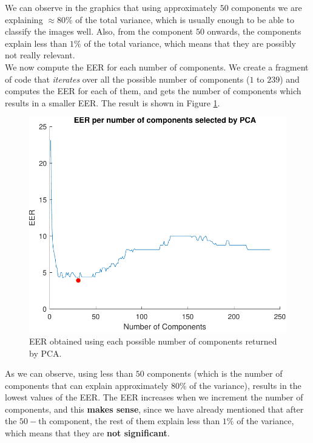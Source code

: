 \documentclass[a4paper]{article}
\begin{document}
We can observe in the graphics that using approximately \(50\) components we are explaining \(\approx 80\%\) of the total variance, which is usually enough to be able to classify the images well. Also, from the component \(50\) onwards, the components explain less than \(1\%\) of the total variance, which means that they are possibly not really relevant.\\

We now compute the EER for each number of components. We create a fragment of code that \emph{iterates} over all the possible number of components (\(1\) to \(239\)) and computes the EER for each of them, and gets the number of components which results in a smaller EER. The result is shown in Figure \ref{fig:ex2c}.


\begin{figure}[H]
  \centering
  \includegraphics[scale=0.7]{Figures/ERR-per-ncomponents}
    \caption{EER obtained using each possible number of components returned by PCA.}
    \label{fig:ex2c}
\end{figure}


As we can observe, using less than \(50\) components (which is the number of components that can explain approximately \(80\%\) of the variance), results in the lowest values of the EER. The EER increases when we increment the number of components, and this \textbf{makes sense}, since we have already mentioned that after the \(50-\)th component, the rest of them explain less than \(1\%\) of the variance, which means that they are \textbf{not significant}. \\
\end{document}
